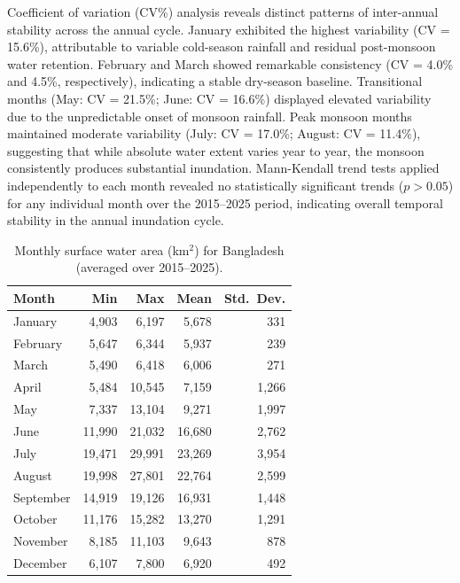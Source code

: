 \documentclass[fleqn,10pt]{article}
\begin{document}
Coefficient of variation (CV\%) analysis reveals distinct patterns of inter-annual stability across the annual cycle. January exhibited the highest variability (CV = 15.6\%), attributable to variable cold-season rainfall and residual post-monsoon water retention. February and March showed remarkable consistency (CV = 4.0\% and 4.5\%, respectively), indicating a stable dry-season baseline. Transitional months (May: CV = 21.5\%; June: CV = 16.6\%) displayed elevated variability due to the unpredictable onset of monsoon rainfall. Peak monsoon months maintained moderate variability (July: CV = 17.0\%; August: CV = 11.4\%), suggesting that while absolute water extent varies year to year, the monsoon consistently produces substantial inundation. Mann-Kendall trend tests applied independently to each month revealed no statistically significant trends ($p > 0.05$) for any individual month over the 2015--2025 period, indicating overall temporal stability in the annual inundation cycle.

\begin{table}[H]
\centering
\caption{Monthly surface water area (km$^{2}$) for Bangladesh (averaged over 2015--2025).}
\label{tab:monthly_water}
\begin{tabular}{lrrrr}
\toprule
\textbf{Month} & \textbf{Min} & \textbf{Max} & \textbf{Mean} & \textbf{Std.\ Dev.} \\
\midrule
January   & 4,903 & 6,197 & 5,678 & 331 \\
February  & 5,647 & 6,344 & 5,937 & 239   \\
March     & 5,490 & 6,418 & 6,006 & 271   \\
April     & 5,484 & 10,545 & 7,159 & 1,266 \\
May       & 7,337 & 13,104 & 9,271 & 1,997 \\
June      & 11,990 & 21,032 & 16,680 & 2,762 \\
July      & 19,471 & 29,991 & 23,269 & 3,954 \\
August    & 19,998 & 27,801 & 22,764 & 2,599 \\
September & 14,919 & 19,126 & 16,931 & 1,448 \\
October   & 11,176 & 15,282 & 13,270 & 1,291 \\
November  & 8,185 & 11,103 & 9,643 & 878 \\
December  & 6,107 & 7,800 & 6,920 & 492 \\
\bottomrule
\end{tabular}
\end{table}
\end{document}
